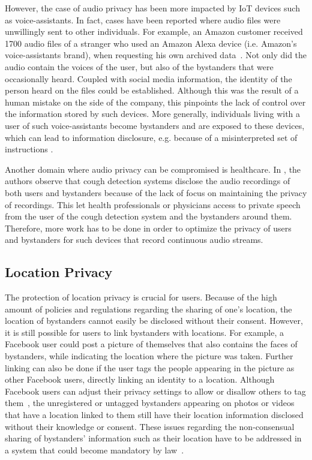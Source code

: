\documentclass[conference, 11pt]{IEEEtran}
\begin{document}
However, the case of audio privacy has been more impacted by \ac{IoT} devices such as voice-assistants. In fact, cases have been reported where audio files were unwillingly sent to other individuals. For example, an Amazon customer received 1700 audio files of a stranger who used an Amazon Alexa device (i.e. Amazon's voice-assistants brand), when requesting his own archived data~\cite{huffpost2018amazon}. Not only did the audio contain the voices of the user, but also of the bystanders that were occasionally heard. Coupled with social media information, the identity of the person heard on the files could be established. Although this was the result of a human mistake on the side of the company, this pinpoints the lack of control over the information stored by such devices. More generally, individuals living with a user of such voice-assistants become bystanders and are exposed to these devices, which can lead to information disclosure, e.g. because of a misinterpreted set of instructions 
\cite{huffpost2018amazon}. 

Another domain where audio privacy can be compromised is healthcare. In \cite{larson2011accurate}, the authors observe that cough detection systems disclose the audio recordings of both users and bystanders because of the lack of focus on maintaining the privacy of recordings. This let health professionals or physicians access to private speech from the user of the cough detection system and the bystanders around them. Therefore, more work has to be done in order to optimize the privacy of users and bystanders for such devices that record continuous audio streams.

\subsection{Location Privacy}\label{Location}
The protection of location privacy is crucial for users. Because of the high amount of policies and regulations regarding the sharing of one's location, the location of bystanders cannot easily be disclosed without their consent. However, it is still possible for users to link bystanders with locations. For example, a Facebook user could post a picture of themselves that also contains the faces of bystanders, while indicating the location where the picture was taken. Further linking can also be done if the user tags the people appearing in the picture as other Facebook users, directly linking an identity to a location. Although Facebook users can adjust their privacy settings to allow or disallow others to tag them~\cite{facebook2020help}, the unregistered or untagged bystanders appearing on photos or videos that have a location linked to them still have their location information disclosed without their knowledge or consent. These issues regarding the non-consensual sharing of bystanders' information such as their location have to be addressed in a system that could become mandatory by law~\cite{olteanu2018consensual}.
\end{document}
